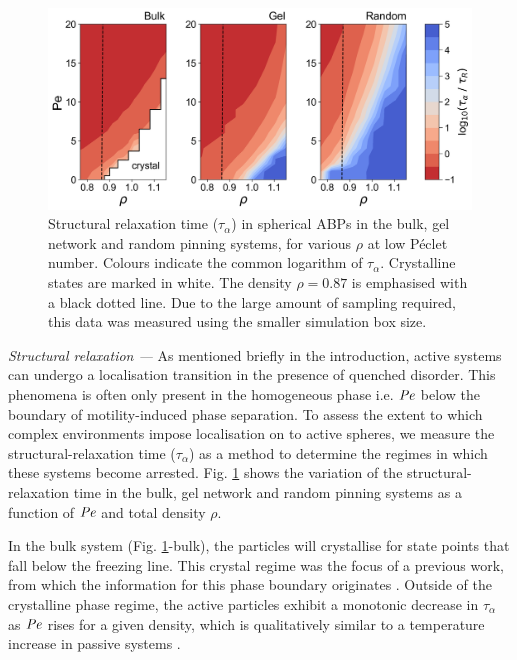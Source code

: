 \begin{figure}
	\centering
	\includegraphics[width=\linewidth]{chapters/activeConfinement/figsActiveConfinement/figContourAlphaTime.png}
	\caption[Structural relaxation in the bulk vs. in confinement]{Structural relaxation time ($\tau_{\alpha}$) in spherical ABPs in the bulk, gel network and random pinning systems, for various $\rho$ at low Péclet number. Colours indicate the common logarithm of $\tau_{\alpha}$. Crystalline states are marked in white. The density $\rho = 0.87$ is emphasised with a black dotted line. Due to the large amount of sampling required, this data was measured using the smaller simulation box size.} 
	\label{fig:TauAlpha}
\end{figure}

\textit{Structural relaxation ---} As mentioned briefly in the introduction, active systems can undergo a localisation transition in the presence of quenched disorder. This phenomena is often only present in the homogeneous phase i.e. $\operatorname{\mathit{P\kern-.08em e}}$ below the boundary of motility-induced phase separation. To assess the extent to which complex environments impose localisation on to active spheres, we measure the structural-relaxation time ($\tau_{\alpha}$) as a method to determine the regimes in which these systems become arrested. Fig. \ref{fig:TauAlpha} shows the variation of the structural-relaxation time in the bulk, gel network and random pinning systems as a function of $\operatorname{\mathit{P\kern-.08em e}}$ and total density $\rho$. 

In the bulk system (Fig. \ref{fig:TauAlpha}-bulk), the particles will crystallise for state points that fall below the freezing line. This crystal regime was the focus of a previous work, from which the information for this phase boundary originates \cite{moore2021a}. Outside of the crystalline phase regime, the active particles exhibit a monotonic decrease in $\tau_{\alpha}$ as $\operatorname{\mathit{P\kern-.08em e}}$ rises for a given density, which is qualitatively similar to a temperature increase in passive systems \cite{malins2013fara}.


